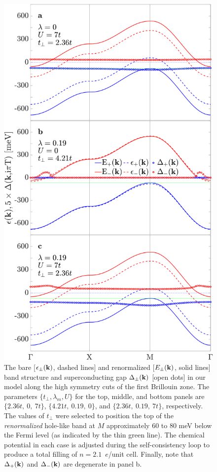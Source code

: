 \documentclass[%
 reprint,
 superscriptaddress,
nofootinbib,
nobibnotes,
 amsmath,amssymb,
 aps,
 prb,
 dvipsnames, 
 floatfix
]{revtex4-2}
\begin{document}
\begin{figure}[t]
    \centering
    \includegraphics[width=\columnwidth]{./figures/Figure2.pdf}\vspace{-0.1cm}
    \caption{The bare [$\epsilon_\pm({\bf k})$, dashed lines] and renormalized 
    [$E_\pm({\bf k})$, solid lines] band structure and superconducting gap 
    $\Delta_\pm({\bf k})$ [open dots] in our model along 
    the high symmetry cuts of the first Brillouin zone. The parameters  
    $\{t_\perp, \lambda_m, U\}$ for the top, middle, and bottom 
    panels are $\{2.36t,~0,~7t\}$, $\{4.21t,~0.19,~0\}$, and 
    $\{2.36t,~0.19,~7t\}$, respectively. 
    The values of $t_\perp$ were selected to 
    position the top of the \textit{renormalized} hole-like band at 
    $M$ approximately $60$ to $80$ meV below the Fermi level (as indicated by the 
    thin green line). The chemical potential in each case is 
    adjusted during the self-consistency loop to produce a total 
    filling of $n = 2.1$~$e$/unit cell. Finally, note that $\Delta_+({\bf k})$ and $\Delta_-({\bf k})$ are degenerate in panel b.}
    \label{fig:Bands}
\end{figure}
\end{document}
